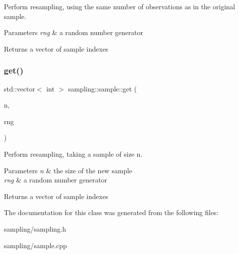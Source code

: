 Perform resampling, using the same number of observations as in the original sample.


\begin{DoxyParams}{Parameters}
{\em rng} & a random number generator \\
\hline
\end{DoxyParams}
\begin{DoxyReturn}{Returns}
a vector of sample indexes 
\end{DoxyReturn}
\mbox{\label{classsampling_1_1sample_ab2c4a10e7971983a8e4acdbb0ad37055}} 
\subsubsection{\texorpdfstring{get()}{get()}\hspace{0.1cm}{\footnotesize\ttfamily [2/2]}}
{\footnotesize\ttfamily std\+::vector$<$ int $>$ sampling\+::sample\+::get (\begin{DoxyParamCaption}\item[{int}]{n,  }\item[{\hyperlink{classsampling_1_1RNG}{sampling\+::\+R\+NG} \&}]{rng }\end{DoxyParamCaption})}

Perform resampling, taking a sample of size {\ttfamily n}.


\begin{DoxyParams}{Parameters}
{\em n} & the size of the new sample \\
\hline
{\em rng} & a random number generator \\
\hline
\end{DoxyParams}
\begin{DoxyReturn}{Returns}
a vector of sample indexes 
\end{DoxyReturn}


The documentation for this class was generated from the following files\+:\begin{DoxyCompactItemize}
\item 
sampling/sampling.\+h\item 
sampling/sample.\+cpp\end{DoxyCompactItemize}
